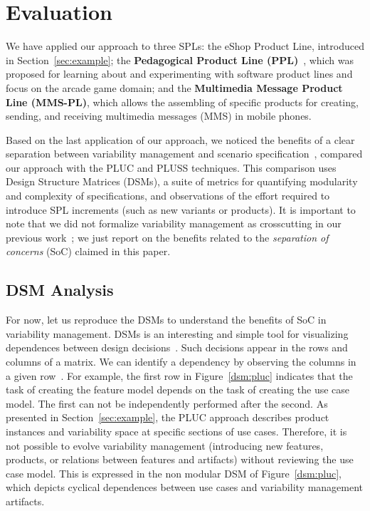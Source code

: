 \documentclass{acm_proc_article-sp}
\begin{document}
\section{Evaluation}
\label{sec:evaluation}

We have applied our approach to three SPLs: the eShop Product Line, introduced in Section~\ref{sec:example}; the  
{\bf Pedagogical Product Line (PPL)}~\cite{ppl-url}, which was proposed for learning about and experimenting with software product lines and focus on the arcade game domain; and the 
{\bf Multimedia Message Product Line (MMS-PL)}, which allows the assembling of specific products for creating, sending, and receiving multimedia messages (MMS) in mobile phones.

Based on the last application of our approach, we noticed the benefits of a clear separation between variability management and scenario specification~\cite{rbonifacio-ea-2008}, compared our approach with the PLUC and PLUSS techniques. This comparison uses Design Structure Matrices (DSMs), a suite of metrics for quantifying modularity and complexity of specifications, and observations of the effort required to introduce SPL increments (such as new variants or products). It is important to note that we did not formalize variability management as crosscutting in our previous work~\cite{rbonifacio-ea-2008}; we just report on the benefits related to the \emph{separation of concerns} (SoC) claimed in this paper.

\subsection{DSM Analysis}
For now, let us reproduce the DSMs to understand the benefits of SoC in variability management. DSMs is an interesting and simple tool for visualizing dependences between design decisions~\cite{clark-design-rules-book}. Such decisions appear in the rows and columns of a matrix. We can identify a dependency by observing the columns in a given row~\cite{clark-design-rules-book}. For example, the first row in Figure~\ref{dsm:pluc} indicates that the task of creating the feature model depends on the task of creating the use case model. The first can not be independently performed after the second. As presented in Section~\ref{sec:example}, the PLUC approach describes product instances and variability space at specific sections of use cases. Therefore, it is not possible to evolve variability management (introducing new features, products, or relations between features and artifacts) without reviewing the use case model.  This is expressed in the non modular DSM of Figure~\ref{dsm:pluc}, which depicts cyclical dependences between use cases and variability management artifacts. 
\end{document}
